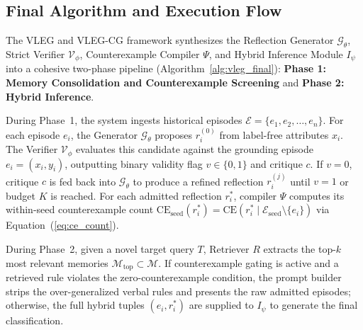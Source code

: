 \documentclass[10pt,a4paper,onecolumn]{article}
\theoremstyle{definition}
\theoremstyle{remark}
\begin{document}
\subsection{Final Algorithm and Execution Flow}
The VLEG and VLEG-CG framework synthesizes the Reflection Generator $\mathcal{G}_\theta$, Strict Verifier $\mathcal{V}_\phi$, Counterexample Compiler $\Psi$, and Hybrid Inference Module $I_\psi$ into a cohesive two-phase pipeline (Algorithm~\ref{alg:vleg_final}): \textbf{Phase 1: Memory Consolidation and Counterexample Screening} and \textbf{Phase 2: Hybrid Inference}.

During Phase~1, the system ingests historical episodes $\mathcal{E} = \{e_1, e_2, \dots, e_n\}$. For each episode $e_i$, the Generator $\mathcal{G}_\theta$ proposes $r_i^{(0)}$ from label-free attributes $x_i$. The Verifier $\mathcal{V}_\phi$ evaluates this candidate against the grounding episode $e_i=(x_i,y_i)$, outputting binary validity flag $v \in \{0, 1\}$ and critique $c$. If $v = 0$, critique $c$ is fed back into $\mathcal{G}_\theta$ to produce a refined reflection $r_i^{(j)}$ until $v=1$ or budget $K$ is reached. For each admitted reflection $r_i^*$, compiler $\Psi$ computes its within-seed counterexample count $\mathrm{CE}_{\mathrm{seed}}(r_i^*) = \mathrm{CE}(r_i^* \mid \mathcal{E}_{\mathrm{seed}} \setminus \{e_i\})$ via Equation~(\ref{eq:ce_count}).

During Phase~2, given a novel target query $T$, Retriever $R$ extracts the top-$k$ most relevant memories $\mathcal{M}_{\mathrm{top}} \subset \mathcal{M}$. If counterexample gating is active and a retrieved rule violates the zero-counterexample condition, the prompt builder strips the over-generalized verbal rules and presents the raw admitted episodes; otherwise, the full hybrid tuples $(e_i, r_i^*)$ are supplied to $I_\psi$ to generate the final classification.
\end{document}
